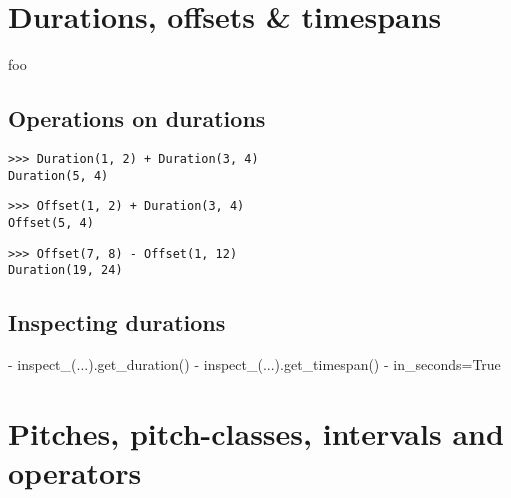 \section{Durations, offsets \& timespans}

foo

\subsection{Operations on durations}

\begin{comment}
<abjad>
Duration(1, 2) + Duration(3, 4)
Offset(1, 2) + Duration(3, 4)
Offset(7, 8) - Offset(1, 12)
</abjad>
\end{comment}

\begin{singlespacing}
\vspace{-0.5\baselineskip}
\begin{lstlisting}
>>> Duration(1, 2) + Duration(3, 4)
Duration(5, 4)
\end{lstlisting}
\begin{lstlisting}
>>> Offset(1, 2) + Duration(3, 4)
Offset(5, 4)
\end{lstlisting}
\begin{lstlisting}
>>> Offset(7, 8) - Offset(1, 12)
Duration(19, 24)
\end{lstlisting}
\end{singlespacing}

\subsection{Inspecting durations}

\begin{markdown}
-   inspect_(...).get_duration()
-   inspect_(...).get_timespan()
-   in_seconds=True
\end{markdown}

\section{Pitches, pitch-classes, intervals and operators}

